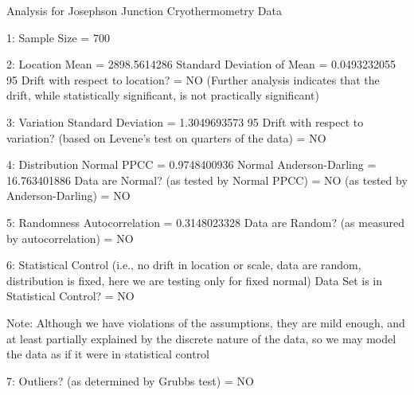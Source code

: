  
 
Analysis for Josephson Junction Cryothermometry Data
 
1: Sample Size                           = 700
 
2: Location
   Mean                                  = 2898.5614286
   Standard Deviation of Mean            = 0.0493232055
   95%
   Drift with respect to location?       = NO
   (Further analysis indicates that
   the drift, while statistically
   significant, is not practically
   significant)
 
3: Variation
   Standard Deviation                    = 1.3049693573
   95%
   Drift with respect to variation?
   (based on Levene's test on quarters
   of the data)                          = NO
 
4: Distribution
   Normal PPCC                           = 0.9748400936
   Normal Anderson-Darling               = 16.763401886
   Data are Normal?
     (as tested by Normal PPCC)          = NO
     (as tested by Anderson-Darling)     = NO
 
5: Randomness
   Autocorrelation                       = 0.3148023328
   Data are Random?
     (as measured by autocorrelation)    = NO
 
6: Statistical Control
   (i.e., no drift in location or scale,
   data are random, distribution is 
   fixed, here we are testing only for
   fixed normal)
   Data Set is in Statistical Control?   = NO
 
   Note: Although we have violations of
   the assumptions, they are mild enough,
   and at least partially explained by the
   discrete nature of the data, so we may model
   the data as if it were in statistical
   control
 
7: Outliers?
   (as determined by Grubbs test)        = NO
 
